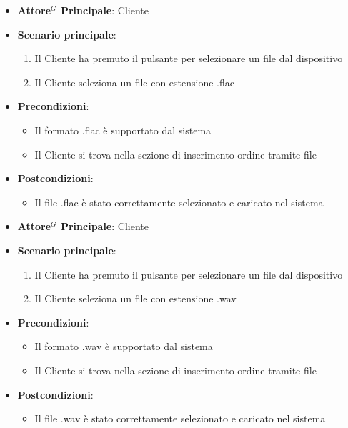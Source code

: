 \label{uc_13.2.3}

\begin{itemize}
    \item \textbf{Attore$^G$ Principale}: Cliente
    \item \textbf{Scenario principale}:
        \begin{enumerate}
            \item Il Cliente ha premuto il pulsante per selezionare un file dal dispositivo
            \item Il Cliente seleziona un file con estensione .flac
        \end{enumerate}
    \item \textbf{Precondizioni}:
        \begin{itemize}
            \item Il formato .flac è supportato dal sistema
            \item Il Cliente si trova nella sezione di inserimento ordine tramite file
        \end{itemize}
    \item \textbf{Postcondizioni}: 
        \begin{itemize}
            \item Il file .flac è stato correttamente selezionato e caricato nel sistema
        \end{itemize}
\end{itemize}

\label{uc_13.2.4}

\begin{itemize}
    \item \textbf{Attore$^G$ Principale}: Cliente
    \item \textbf{Scenario principale}:
        \begin{enumerate}
            \item Il Cliente ha premuto il pulsante per selezionare un file dal dispositivo
            \item Il Cliente seleziona un file con estensione .wav
        \end{enumerate}
    \item \textbf{Precondizioni}:
        \begin{itemize}
            \item Il formato .wav è supportato dal sistema
            \item Il Cliente si trova nella sezione di inserimento ordine tramite file
        \end{itemize}
    \item \textbf{Postcondizioni}: 
        \begin{itemize}
            \item Il file .wav è stato correttamente selezionato e caricato nel sistema
        \end{itemize}
\end{itemize}

